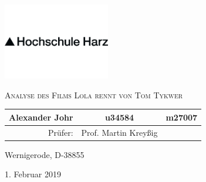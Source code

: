 

\pagestyle{empty}
\clearpage

\newcommand*{\titleUL}{\begingroup%
\begin{center}

\includegraphics[width=0.35\textwidth]{img/hsharz/logo.png}

\LARGE{\textsc{Analyse des Films Lola rennt von Tom Tykwer}}
\vspace{0.8\baselineskip}

\vfill


\vfill

\normalsize


\begin{tabular}{r c l}
Alexander Johr & u34584 & m27007 \\
\hline
Prüfer: &  Prof. Martin Kreyßig & \\
\end{tabular}

\vfill

Wernigerode, D-38855

\large 
1. Februar 2019

\end{center}

\endgroup}

\titleUL
